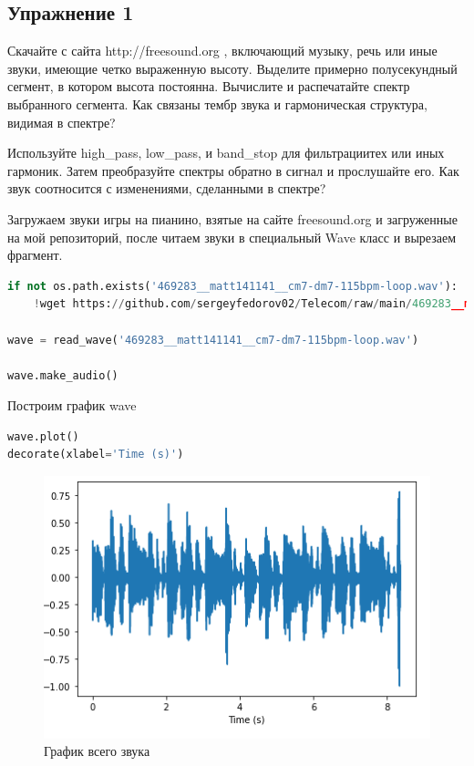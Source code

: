 \subsection{Упражнение 1}

Скачайте с сайта http://freesound.org , включающий музыку, речь или иные звуки, имеющие четко выраженную высоту. Выделите примерно полусекундный сегмент, в котором высота постоянна. Вычислите и распечатайте спектр выбранного сегмента. Как связаны тембр звука и гармоническая структура, видимая в спектре?


\noindent Используйте high\_pass, low\_pass, и band\_stop для фильтрациитех или иных гармоник. Затем преобразуйте спектры обратно в сигнал и прослушайте его. Как звук соотносится с изменениями, сделанными в спектре?
    

Загружаем звуки игры на пианино, взятые на сайте freesound.org и загруженные на мой репозиторий, после читаем звуки в специальный Wave класс и вырезаем фрагмент.

\begin{lstlisting}[language=Python]
if not os.path.exists('469283__matt141141__cm7-dm7-115bpm-loop.wav'):
    !wget https://github.com/sergeyfedorov02/Telecom/raw/main/469283__matt141141__cm7-dm7-115bpm-loop.wav

wave = read_wave('469283__matt141141__cm7-dm7-115bpm-loop.wav')

wave.make_audio()
\end{lstlisting}

Построим график wave
\begin{lstlisting}[language=Python]
wave.plot()
decorate(xlabel='Time (s)')
\end{lstlisting}

\begin{figure}[H]
	\begin{center}
		\includegraphics[scale=1]{fig/lab01/lab01_01.png}
		\caption{График всего звука}
	\end{center}
\end{figure}

